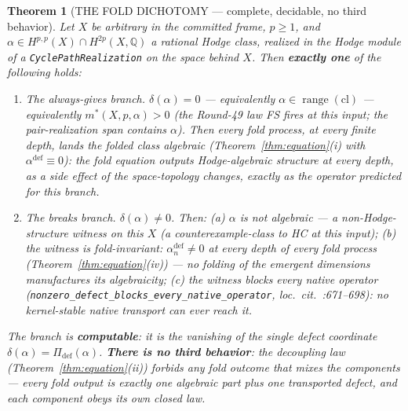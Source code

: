\documentclass[11pt]{article}
\newtheorem{theorem}{Theorem}[section]
\begin{document}
\begin{theorem}[THE FOLD DICHOTOMY — complete, decidable, no third behavior]
\label{thm:dichotomy}
Let $X$ be arbitrary in the committed frame, $p\ge 1$, and $\alpha\in H^{p,p}(X)\cap H^{2p}(X,\mathbb{Q})$ a rational Hodge class, realized in the Hodge module of a \texttt{CyclePathRealization} on the space behind $X$. Then \textbf{exactly one} of the following holds:
\begin{enumerate}
\item[\textbf{(A)}] \emph{The always-gives branch.} $\delta(\alpha)=0$ — equivalently $\alpha\in\operatorname{range}(\mathrm{cl})$ — equivalently $m^*(X,p,\alpha)>0$ (the Round-49 law FS fires at this input; the pair-realization span contains $\alpha$). Then \emph{every} fold process, at \emph{every} finite depth, lands the folded class algebraic (Theorem~\ref{thm:equation}(i) with $\alpha^{\mathrm{def}}\equiv 0$): the fold equation outputs Hodge-algebraic structure at every depth, as a side effect of the space-topology changes, exactly as the operator predicted for this branch.
\item[\textbf{(B)}] \emph{The breaks branch.} $\delta(\alpha)\ne 0$. Then: (a) $\alpha$ is not algebraic — a \emph{non-Hodge-structure witness} on this $X$ (a counterexample-class to HC at this input); (b) the witness is \emph{fold-invariant}: $\alpha^{\mathrm{def}}_n\ne 0$ at every depth of every fold process (Theorem~\ref{thm:equation}(iv)) — no folding of the emergent dimensions manufactures its algebraicity; (c) the witness \emph{blocks every native operator} (\texttt{nonzero\_defect\_blocks\_every\_native\_operator}, loc.\ cit.\ :671--698): no kernel-stable native transport can ever reach it.
\end{enumerate}
The branch is \textbf{computable}: it is the vanishing of the single defect coordinate $\delta(\alpha)=\Pi_{\mathrm{def}}(\alpha)$. \textbf{There is no third behavior}: the decoupling law (Theorem~\ref{thm:equation}(ii)) forbids any fold outcome that mixes the components — every fold output is exactly one algebraic part plus one transported defect, and each component obeys its own closed law.
\end{theorem}
\end{document}
